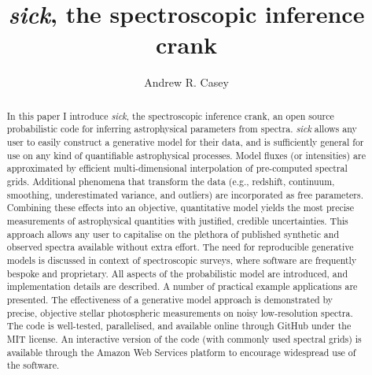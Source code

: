 \documentclass{aastex}
\newcommand{\sick}{\textit{sick}}
\begin{document}
\title{\sick, the spectroscopic inference crank}

\author{Andrew R. Casey}





\begin{abstract}
In this paper I introduce \sick{}, the spectroscopic inference crank, an open source probabilistic code for inferring astrophysical parameters from spectra. \sick{} allows any user to easily construct a generative model for their data, and is sufficiently general for use on any kind of quantifiable astrophysical processes. Model fluxes (or intensities) are approximated by efficient multi-dimensional interpolation of pre-computed spectral grids. Additional phenomena that transform the data (e.g., redshift, continuum, smoothing, underestimated variance, and outliers) are incorporated as free parameters. Combining these effects into an objective, quantitative model yields the most precise measurements of astrophysical quantities with justified, credible uncertainties. This approach allows any user to capitalise on the plethora of published synthetic and observed spectra available without extra effort. The need for reproducible generative models is discussed in context of spectroscopic surveys, where software are frequently bespoke and proprietary. All aspects of the probabilistic model are introduced, and implementation details are described. A number of practical example applications are presented. The effectiveness of a generative model approach is demonstrated by precise, objective stellar photospheric measurements on noisy low-resolution spectra. The code is well-tested, parallelised, and available online through GitHub under the MIT license. An interactive version of the code (with commonly used spectral grids) is available through the Amazon Web Services platform to encourage widespread use of the software.
\end{abstract}
\end{document}
